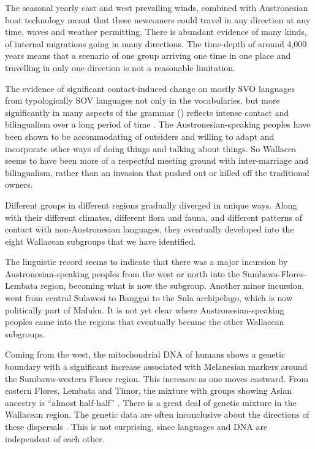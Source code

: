 The seasonal yearly east
and west prevailing winds,
combined with Austronesian boat technology meant that these newcomers
could travel in any direction at any time,
waves and weather permitting.
There is abundant evidence of many kinds,
of internal migrations going in many directions.
The time-depth of around 4,000 years means that a scenario of
one group arriving one time in one place
and travelling in only one direction is not a reasonable limitation.

The evidence of significant contact-induced change on mostly
SVO languages from typologically SOV languages not only in the
vocabularies, but more significantly in many aspects of the grammar ()
reflects intense contact and bilingualism over a long period of time \citep{ThomasonKaufman1988}.
The Austronesian-speaking peoples have been shown to be accommodating
of outsiders and willing to adapt
and incorporate other ways of doing things
and talking about things.
So Wallacea seems to have been more of a respectful meeting ground
with inter-marriage and bilingualism, rather than an invasion that pushed out or
killed off the traditional owners.

Different groups in different regions gradually diverged in unique ways.
Along with their different climates,
different flora and fauna, and different patterns of contact
with non-Austronesian languages, they eventually developed into the eight Wallacean subgroups
that we have identified.

The linguistic record seems to indicate that there was a major
incursion by Austronesian-speaking peoples from the west or north
into the Sumbawa-Flores-Lembata region,
becoming what is now the  subgroup.
Another minor incursion, went from central Sulawesi to Banggai
to the Sula archipelago,
which is now politically part of Maluku.
It is not yet clear where Austronesian-speaking peoples came
into the regions that eventually became the other Wallacean subgroups.

\largerpage
Coming from the west,
the mitochondrial DNA of humans shows a genetic boundary with
a significant increase associated with Melanesian markers around
the Sumbawa-western Flores region.
This increases as one moves eastward.
From eastern Flores, Lembata
and Timor, the mixture with groups showing Asian ancestry is
“almost half-half” \citep{Fricke2019,Klamer2019}.
There is a great deal of genetic mixture in the Wallacean region.
The genetic data are often inconclusive about the directions
of these dispersals \citep{LansingSudoyo2011}.
This is not surprising,
since languages and DNA are independent of each other.

